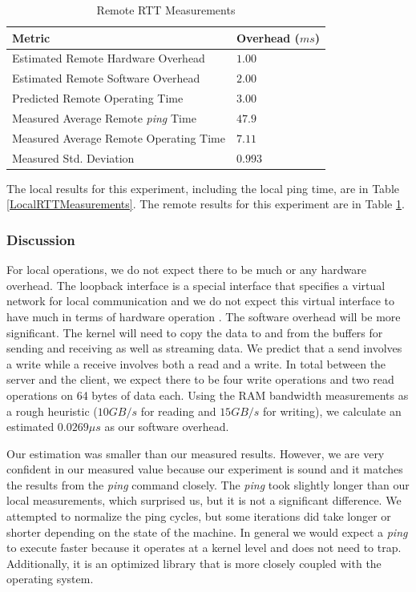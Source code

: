 \documentclass[sigconf]{acmart}
\begin{document}
\begin{table}[h!]
\centering
\caption{Remote RTT Measurements}
\label{RemoteRTTMeasurements}
\begin{tabular}{|l|l|}
\hline
{\textbf{Metric}}							& {\textbf{Overhead ($ms$)}}	\\ \hline
Estimated Remote Hardware Overhead			& $1.00$						\\ \hline
Estimated Remote Software Overhead			& $2.00$						\\ \hline
Predicted Remote Operating Time				& $3.00$						\\ \hline
Measured Average Remote \textit{ping} Time	& $47.9$						\\ \hline
Measured Average Remote Operating Time		& $7.11$						\\ \hline
Measured Std. Deviation						& $0.993$						\\ \hline
\end{tabular}
\end{table}
The local results for this experiment, including the local ping time, are in Table \ref{LocalRTTMeasurements}. The remote results for this experiment are in Table \ref{RemoteRTTMeasurements}.

\subsubsection{Discussion}
For local operations, we do not expect there to be much or any hardware overhead. The loopback interface is a special interface that specifies a virtual network for local communication and we do not expect this virtual interface to have much in terms of hardware operation \cite{Loopback}. The software overhead will be more significant. The kernel will need to copy the data to and from the buffers for sending and receiving as well as streaming data. We predict that a send involves a write while a receive involves both a read and a write. In total between the server and the client, we expect there to be four write operations and two read operations on 64 bytes of data each. Using the RAM bandwidth measurements as a rough heuristic ($10GB/s$ for reading and $15GB/s$ for writing), we calculate an estimated $0.0269 \mu s$ as our software overhead.

Our estimation was smaller than our measured results. However, we are very confident in our measured value because our experiment is sound and it matches the results from the \textit{ping} command closely. The \textit{ping} took slightly longer than our local measurements, which surprised us, but it is not a significant difference. We attempted to normalize the ping cycles, but some iterations did take longer or shorter depending on the state of the machine. In general we would expect a \textit{ping} to execute faster because it operates at a kernel level and does not need to trap. Additionally, it is an optimized library that is more closely coupled with the operating system.
\end{document}
